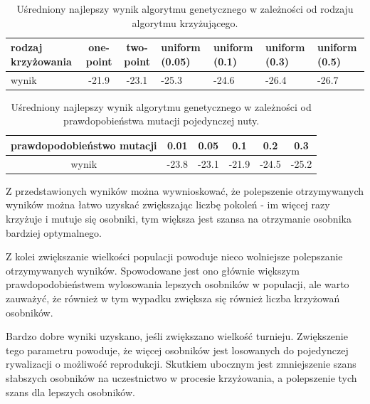 \documentclass{article}
\begin{document}
\begin{table}
\begin{center}
  \begin{tabular}{ | p{1.4cm} || c | c | p{1.4cm}  | p{1.4cm}   | p{1.4cm}  | p{1.4cm}  | }
    \hline
	rodzaj krzyżowania & one-point & two-point & uniform (0.05) & uniform (0.1) & uniform (0.3) & uniform (0.5) \\ \hline
	wynik & -21.9 & -23.1 & -25.3 & -24.6 & -26.4 & -26.7 \\ \hline 
  \end{tabular}
  \caption{Uśredniony najlepszy wynik algorytmu genetycznego w zależności od rodzaju algorytmu krzyżującego.}
  \label{tab:wynik_a_crossover}
  \end{center}
\end{table}

\begin{table}
\begin{center}
  \begin{tabular}{ | c || c | c | c | c | c | }
    \hline
	prawdopodobieństwo mutacji & 0.01 & 0.05 & 0.1 & 0.2 & 0.3 \\ \hline
	wynik & -23.8 & -23.1 & -21.9 & -24.5 & -25.2 \\ \hline 
  \end{tabular}
  \caption{Uśredniony najlepszy wynik algorytmu genetycznego w zależności od prawdopobieństwa mutacji pojedynczej nuty.}
  \label{tab:wynik_a_mutacja}
  \end{center}
\end{table}

Z przedstawionych wyników można wywnioskować, że polepszenie otrzymywanych wyników można łatwo uzyskać zwiększając liczbę pokoleń - im więcej razy krzyżuje i mutuje się osobniki, tym większa jest szansa na otrzymanie osobnika bardziej optymalnego.

Z kolei zwiększanie wielkości populacji powoduje nieco wolniejsze polepszanie otrzymywanych wyników. Spowodowane jest ono głównie większym prawdopodobieństwem wylosowania lepszych osobników w populacji, ale warto zauważyć, że również w tym wypadku zwiększa się również liczba krzyżowań osobników.

Bardzo dobre wyniki uzyskano, jeśli zwiększano wielkość turnieju. Zwiększenie tego parametru powoduje, że więcej osobników jest losowanych do pojedynczej rywalizacji o możliwość reprodukcji. Skutkiem ubocznym jest zmniejszenie szans słabszych osobników na uczestnictwo w procesie krzyżowania, a polepszenie tych szans dla lepszych osobników.
\end{document}
